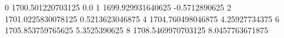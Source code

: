 0 1700.501220703125 0.0
1 1699.929931640625 -0.5712890625
2 1701.0225830078125 0.5213623046875
4 1704.760498046875 4.25927734375
6 1705.853759765625 5.3525390625
8 1708.5469970703125 8.0457763671875
